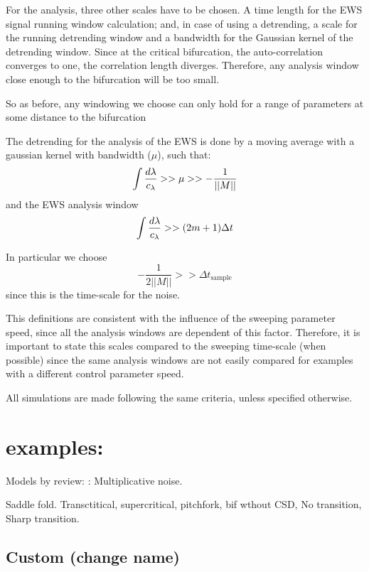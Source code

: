 For the analysis, three other scales have to be chosen. A time length for the EWS signal running window calculation; and, in case of using a detrending, a scale for the running detrending window and a bandwidth for the Gaussian kernel of the detrending window. 
Since at the critical bifurcation, the auto-correlation converges to one, the correlation length diverges. 
Therefore, any analysis window close enough to the bifurcation will be too small.

So as before, any windowing we choose can only hold for a range of parameters at some distance to the bifurcation

The detrending for the analysis of the EWS is done by a moving average with a gaussian kernel with bandwidth ($\mu$), such that:
\begin{equation}
	\int \frac{d\lambda}{c_\lambda} >> \mu >> -\frac{1}{||M||}
\end{equation}
and the EWS analysis window
\begin{equation}
	\int \frac{d\lambda}{c_\lambda} >> (2m+1)\Delta t 
\end{equation}

In particular we choose
\begin{equation}
	-\frac{1}{2||M||} >> \Delta t_{\mathrm{sample}}  
\end{equation}
 since this is the time-scale for the noise.
 
This definitions are consistent with the influence of the sweeping parameter speed, since all the analysis windows are dependent of this factor. 
Therefore, it is important to state this scales compared to the sweeping time-scale (when possible) since the same analysis windows are not easily compared for examples with a different control parameter speed.

All simulations are made following the same criteria, unless specified otherwise.

\section{examples:}
Models by review: 
\cite{Dutta}: Multiplicative noise.

Saddle fold. Transctitical, supercritical, pitchfork, bif wthout CSD, No transition, Sharp transition.



\subsection{Custom (change name)}


